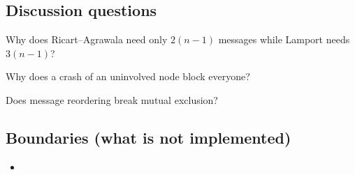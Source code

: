 \subsection{Discussion questions}
\begin{qa}{Why does Ricart--Agrawala need only $2(n-1)$ messages while Lamport needs $3(n-1)$?}
\end{qa}
\begin{qa}{Why does a crash of an uninvolved node block everyone?}
\end{qa}
\begin{qa}{Does message reordering break mutual exclusion?}
\end{qa}

\subsection{Boundaries (what is not implemented)}
\begin{itemize}[itemsep=1pt]
  \item {}
\end{itemize}
